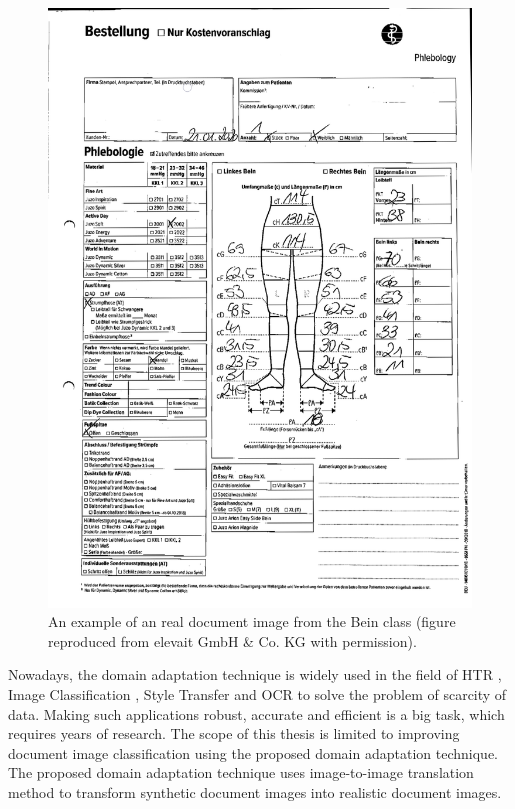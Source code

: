 \begin{figure}
\begin{minipage}[b]{0.4\textwidth}
    \includegraphics[width=\textwidth]{images/Introduction/BeinRealImage.png}
    \caption[An example of an real document image from the Bein class.]{An example of an real document image from the Bein class (figure reproduced from elevait GmbH \& Co. KG with permission).}
    \label{fig:reallImageBein}
  \end{minipage}
\end{figure}


Nowadays, the domain adaptation technique is widely used in the field of \ac{HTR} \cite{Kang_2020}, Image Classification \cite{5288526}, Style Transfer \cite{johnson2016perceptual} and \ac{OCR} \cite{8978011} to solve the problem of scarcity of data. Making such applications robust, accurate and efficient is a big task, which requires years of research. The scope of this thesis is limited to improving document image classification using the proposed domain adaptation technique. The proposed domain adaptation technique uses image-to-image translation method to transform synthetic document images into realistic document images.


